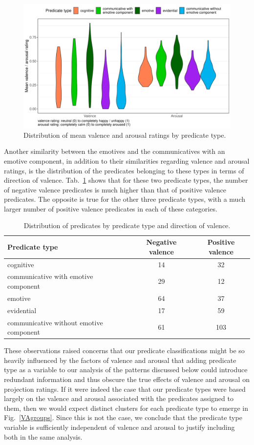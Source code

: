 \documentclass[11pt,fleqn]{article}
\newcommand{\tableref}[1]{Tab.~\ref{#1}}
\newcommand{\figref}[1]{Fig.~\ref{#1}}
\newcommand{\6}{\mbox{$[\hspace*{-.6mm}[$}}
\newcommand{\9}{\mbox{$]\hspace*{-.6mm}]$}}
\begin{document}
\begin{figure}[H]
	\centering
	\includegraphics[width=.7\textwidth]{valence-arousal-by-predicateType2}
	\caption{Distribution of mean valence and arousal ratings by predicate type.}
	\label{VAviolins}
\end{figure}

Another similarity between the emotives and the communicatives with an emotive component, in addition to their similarities regarding valence and arousal ratings, is the distribution of the predicates belonging to these types in terms of direction of valence. \tableref{Vdistribution} shows that for these two predicate types, the number of negative valence predicates is much higher than that of positive valence predicates. The opposite is true for the other three predicate types, with a much larger number of positive valence predicates in each of these categories.

\begin{table}[H]
	\centering
	\begin{tabular}{l|c|c} 
		Predicate type & Negative valence & Positive valence \\ 
		\hline
		cognitive & 14 & 32 \\
		communicative with emotive component & 29 & 12 \\
		emotive & 64 & 37 \\
		evidential & 17 & 59 \\
		communicative without emotive component & 61 & 103 \\
	\end{tabular}
	\caption{Distribution of predicates by predicate type and direction of valence.}
	\label{Vdistribution}
\end{table}

These observations raised concerns that our predicate classifications might be so heavily influenced by the factors of valence and arousal that adding predicate type as a variable to our analysis of the patterns discussed below could introduce redundant information and thus obscure the true effects of valence and arousal on projection ratings. If it were indeed the case that our predicate types were based largely on the valence and arousal associated with the predicates assigned to them, then we would expect distinct clusters for each predicate type to emerge in \figref{VAgroups}. Since this is not the case, we conclude that the predicate type variable is sufficiently independent of valence and arousal to justify including both in the same analysis.
\end{document}

